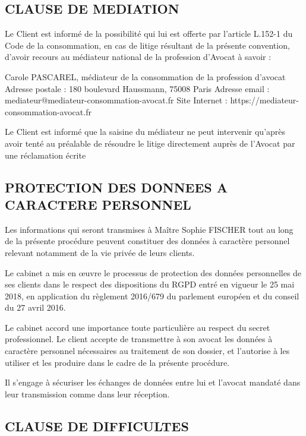 \documentclass[
  11pt,
]{letter}
\begin{document}
\begin{letter}{}
\hypertarget{clause-de-mediation}{%
\subsection{CLAUSE DE MEDIATION}\label{clause-de-mediation}}

Le Client est informé de la possibilité qui lui est offerte par
l'article L.152-1 du Code de la consommation, en cas de litige résultant
de la présente convention, d'avoir recours au médiateur national de la
profession d'Avocat à savoir :

Carole PASCAREL, médiateur de la consommation de la profession d'avocat
Adresse postale : 180 boulevard Haussmann, 75008 Paris Adresse email :
mediateur@mediateur-consommation-avocat.fr Site Internet :
https://mediateur-consommation-avocat.fr

Le Client est informé que la saisine du médiateur ne peut intervenir
qu'après avoir tenté au préalable de résoudre le litige directement
auprès de l'Avocat par une réclamation écrite

\hypertarget{protection-des-donnees-a-caractere-personnel}{%
\subsection{PROTECTION DES DONNEES A CARACTERE
PERSONNEL}\label{protection-des-donnees-a-caractere-personnel}}

Les informations qui seront transmises à Maître Sophie FISCHER tout au
long de la présente procédure peuvent constituer des données à caractère
personnel relevant notamment de la vie privée de leurs clients.

Le cabinet a mis en œuvre le processus de protection des données
personnelles de ses clients dans le respect des dispositions du RGPD
entré en vigueur le 25 mai 2018, en application du règlement 2016/679 du
parlement européen et du conseil du 27 avril 2016.

Le cabinet accord une importance toute particulière au respect du secret
professionnel. Le client accepte de transmettre à son avocat les données
à caractère personnel nécessaires au traitement de son dossier, et
l'autorise à les utiliser et les produire dans le cadre de la présente
procédure.

Il s'engage à sécuriser les échanges de données entre lui et l'avocat
mandaté dans leur transmission comme dans leur réception.

\hypertarget{clause-de-difficultes}{%
\subsection{CLAUSE DE DIFFICULTES}\label{clause-de-difficultes}}


\end{letter}
\end{document}
